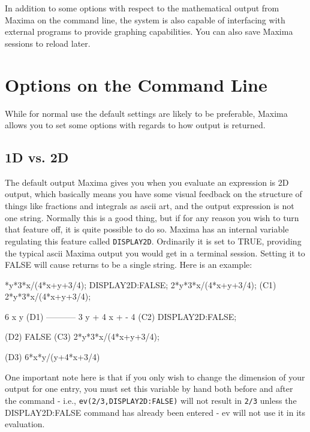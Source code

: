 
In addition to some options with respect to the mathematical output from Maxima
on the command line, the system is also capable of interfacing with external
programs to provide graphing capabilities.  You can also save Maxima sessions 
to reload later.


\section{Options on the Command Line}

While for normal use the default settings are likely to be preferable, Maxima 
allows you to set some options with regards to how output is returned.  

\subsection{1D vs. 2D}

The default output Maxima gives you when you evaluate an expression is 2D 
output, which basically means you have some visual feedback on the structure
of things like fractions and integrals as ascii art, and the output expression
is not one string.  Normally this is a good thing, but if for any reason you 
wish to turn that feature off, it is quite possible to do so.  Maxima has an
internal variable regulating this feature called \texttt{DISPLAY2D}.  
Ordinarily it is set to TRUE, providing the typical ascii Maxima output you
would get in a terminal session.  Setting it to FALSE will cause returns to
be a single string.  Here is an example:

*y*3*x/(4*x+y+3/4);
DISPLAY2D:FALSE;
2*y*3*x/(4*x+y+3/4);
\maximasession
(C1) 2*y*3*x/(4*x+y+3/4);

                                     6 x y
(D1)                              -----------
                                            3
                                  y + 4 x + -
                                            4
(C2) DISPLAY2D:FALSE;

(D2) FALSE
(C3) 2*y*3*x/(4*x+y+3/4);

(D3) 6*x*y/(y+4*x+3/4)
\endmaximasession

One important note here is that if you only wish to change the dimension
of your output for one entry, you must set this variable by hand both
before and after the command - i.e., \texttt{ev(2/3,DISPLAY2D:FALSE)} will
not result in \texttt{2/3} unless the DISPLAY2D:FALSE command has already
been entered - ev will not use it in its evaluation.

